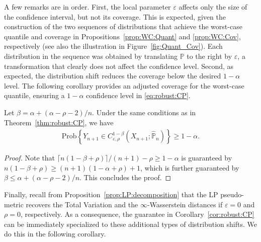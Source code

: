 \documentclass[11pt,a4paper]{article}
\begin{document}
A few remarks are in order. First, the local parameter $\varepsilon$ affects only the size of the confidence interval, but not its coverage. This is expected, given the construction of the two sequences of distributions that achieve the worst-case quantile and coverage in Propositions~\ref{prop:WC:Quant} and \ref{prop:WC:Cov}, respectively (see also the illustration in Figure~\ref{fig:Quant_Cov}). Each distribution in the sequence was obtained by translating $\mathbb P$ to the right by $\varepsilon$, a transformation that clearly does not affect the confidence level. Second, as expected, the distribution shift reduces the coverage below the desired $1-\alpha$ level. The following corollary provides an adjusted coverage for the worst-case quantile, ensuring a $1-\alpha$ confidence level in \eqref{eq:robust:CP}.

\begin{corollary}
\label{cor:robust:CP}
Let $\beta = \alpha + {(\alpha-\rho-2)}/{n}$. Under the same conditions as in Theorem~\ref{thm:robust:CP}, we have
\begin{align}
\label{eq:cor:robust:CP}
    \text{Prob}\left\{ Y_{n+1} \in C_{\varepsilon,\rho}^{1-\beta}\left(X_{n+1};\widehat{\mathbb P}_n \right) \right\} \geq 1 - \alpha.
\end{align}
\end{corollary}
\begin{proof}
Note that ${\lceil n(1-\beta+\rho)\rceil}/{(n+1)} - \rho \geq 1-\alpha$ is guaranteed by $n(1-\beta+\rho) \geq (n+1)(1-\alpha+\rho) + 1$, which is further guaranteed by $\beta \leq \alpha + {(\alpha-\rho-2)}/{n}$. This concludes the proof.
\end{proof}

Finally, recall from Proposition~\ref{prop:LP:decomposition} that the LP pseudo-metric recovers the Total Variation and the $\infty$-Wasserstein distances if $\varepsilon =0$ and $\rho = 0$, respectively. As a consequence, the guarantee in Corollary~\ref{cor:robust:CP} can be immediately specialized to these additional types of distribution shifts. We do this in the following corollary.
\end{document}
